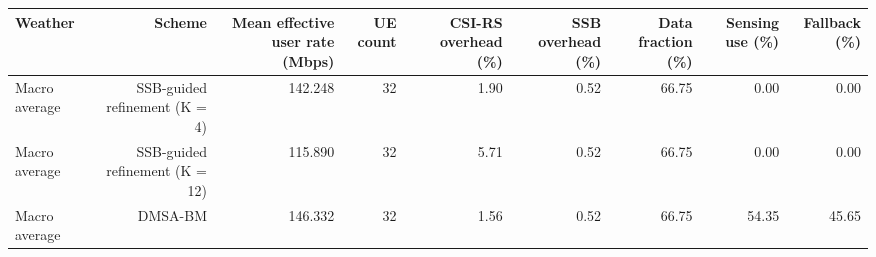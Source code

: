 \begin{tabular}{lrrrrrrrr}
\toprule
Weather & Scheme & Mean effective user rate (Mbps) & UE count & CSI-RS overhead (\%) & SSB overhead (\%) & Data fraction (\%) & Sensing use (\%) & Fallback (\%) \\
\midrule
Macro average & SSB-guided refinement (K = 4) & 142.248 & 32 & 1.90 & 0.52 & 66.75 & 0.00 & 0.00 \\
Macro average & SSB-guided refinement (K = 12) & 115.890 & 32 & 5.71 & 0.52 & 66.75 & 0.00 & 0.00 \\
Macro average & DMSA-BM & 146.332 & 32 & 1.56 & 0.52 & 66.75 & 54.35 & 45.65 \\
\bottomrule
\end{tabular}
